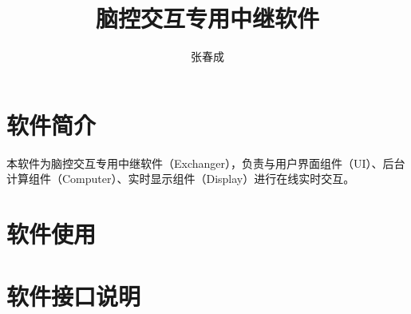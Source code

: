 \documentclass[UTF8]{ctexart}
\title{脑控交互专用中继软件}
\author{张春成}
\begin{document}
\maketitle
\tableofcontents
\newpage

\section{软件简介}

本软件为脑控交互专用中继软件（Exchanger），负责与用户界面组件（UI）、后台计算组件（Computer）、实时显示组件（Display）进行在线实时交互。

\section{软件使用}

\section{软件接口说明}
\end{document}
